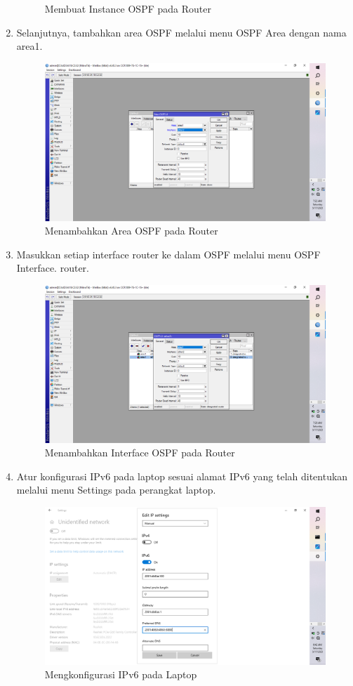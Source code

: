 \begin{enumerate}
\begin{figure}[H]
        \caption{Membuat Instance OSPF pada Router}
        \label{fig:gambar6}
    \end{figure}    
    \item Selanjutnya, tambahkan area OSPF melalui menu OSPF Area dengan nama area1.
    \begin{figure}[H]
        \centering
        \includegraphics[width=0.5\linewidth]{P1/gambar6.png}
        \caption{Menambahkan Area OSPF pada Router}
        \label{fig:gambar7}
    \end{figure}
    \item Masukkan setiap interface router ke dalam OSPF melalui menu OSPF Interface. router.
    \begin{figure}[H]
        \centering
        \includegraphics[width=0.5\linewidth]{P1/gambar7.png}
        \caption{Menambahkan Interface OSPF pada Router}
        \label{fig:gambar8}
    \end{figure}
        \item Atur konfigurasi IPv6 pada laptop sesuai alamat IPv6 yang telah ditentukan melalui menu Settings pada perangkat laptop.
    \begin{figure}[H]
        \centering
        \includegraphics[width=0.5\linewidth]{P1/gambar4.png}
        \caption{Mengkonfigurasi IPv6 pada Laptop}
        \label{fig:gambar4}
    \end{figure}

\end{enumerate}
